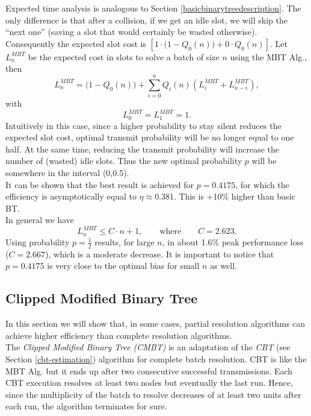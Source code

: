 \documentclass[11pt,a4paper,twoside,openright]{book}
\newcommand{\rev}[1]{\textcolor{Cerulean}{#1}}
\begin{document}
Expected time analysis is analogous  to Section \ref{basicbinarytreedescription}. The only difference is that after a collision, if we get an idle slot, we will skip the ``next one'' (saving a slot that would certainly be wasted otherwise). Consequently the expected slot cost is $\left[1 \cdot \bigl(1-Q_{0}(n)\bigr)+ 0\cdot Q_{0}(n)\right]$. Let $L_{n}^{MBT}$ be the expected cost in slots to solve a batch of size $n$ using the MBT Alg., then\\
\begin{equation}
L_{n}^{MBT} = \bigl(1 - Q_{0}(n)\bigr)+\sum_{i=0}^{n} Q_{i}(n) (L_{i}^{MBT}+L_{n-i}^{MBT}),
\end{equation}
with
\begin{equation*}
L_{0}^{MBT} = L_{1}^{MBT}  = 1.
\end{equation*}
\rev{Intuitively in this case, since a higher probability to stay silent reduces the expected slot cost, optimal transmit probability will be no longer equal to one half.} At the same time, reducing the transmit probability will increase the number of (wasted) idle slots. Thus the new optimal probability $p$ will be somewhere in the interval (0,0.5).\\
It can be shown \cite{massey} that the best result is achieved for $p=0.4175$, for which the efficiency is asymptotically equal to $\eta \approx 0.381$. This is  +10\% higher than basic BT.\\
In general we have 
\begin{equation}
L_{n}^{MBT}\leq C \cdot n +1, \qquad \textrm{where} \qquad C=2.623.
\end{equation}
Using probability $p={\displaystyle\frac{1}{2}}$  results, for large $n$, in about 1.6\% peak performance loss  ($C=2.667$), which is a moderate decrease. It is important to notice that  $p=0.4175$ is very close to the optimal bias for small $n$ as well.\\

\subsection{Clipped Modified Binary Tree}
In this section we will show that, in some cases, partial resolution algorithms can achieve higher efficiency than complete resolution algorithms.\\
The \emph{Clipped Modified Binary Tree (CMBT)} is an adaptation of the \emph{CBT} (see Section \ref{cbt-estimation}) algorithm for complete batch resolution. CBT is like the MBT Alg. but it ends up after two consecutive successful transmissions. Each CBT execution resolves at least two nodes but eventually the last run. Hence, since the multiplicity of the batch to resolve decreases of at least two units after each run, the algorithm terminates for sure.\\
\end{document}
